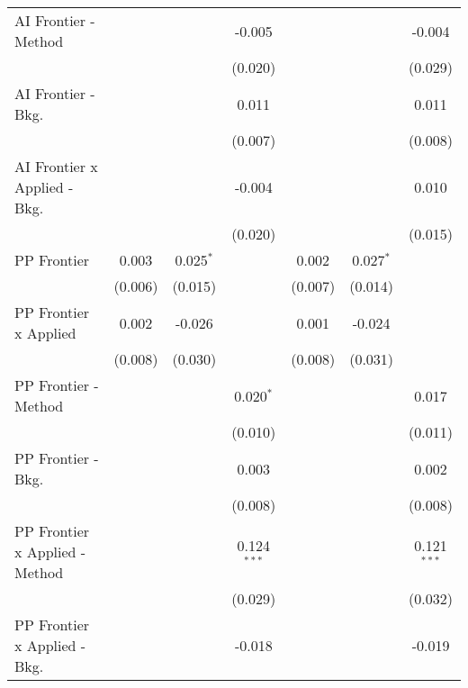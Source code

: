\begin{tabular}{lcccccc}
   AI Frontier - Method           &         &              & -0.005         &              &                & -0.004\\   
                                  &         &              & (0.020)        &              &                & (0.029)\\   
   AI Frontier - Bkg.             &         &              & 0.011          &              &                & 0.011\\   
                                  &         &              & (0.007)        &              &                & (0.008)\\   
   AI Frontier x Applied - Bkg.   &         &              & -0.004         &              &                & 0.010\\   
                                  &         &              & (0.020)        &              &                & (0.015)\\   
   PP Frontier                    & 0.003   & 0.025$^{*}$  &                & 0.002        & 0.027$^{*}$    &   \\   
                                  & (0.006) & (0.015)      &                & (0.007)      & (0.014)        &   \\   
   PP Frontier x Applied          & 0.002   & -0.026       &                & 0.001        & -0.024         &   \\   
                                  & (0.008) & (0.030)      &                & (0.008)      & (0.031)        &   \\   
   PP Frontier - Method           &         &              & 0.020$^{*}$    &              &                & 0.017\\   
                                  &         &              & (0.010)        &              &                & (0.011)\\   
   PP Frontier - Bkg.             &         &              & 0.003          &              &                & 0.002\\   
                                  &         &              & (0.008)        &              &                & (0.008)\\   
   PP Frontier x Applied - Method &         &              & 0.124$^{***}$  &              &                & 0.121$^{***}$\\   
                                  &         &              & (0.029)        &              &                & (0.032)\\   
   PP Frontier x Applied - Bkg.   &         &              & -0.018         &              &                & -0.019\\   

\end{tabular}

